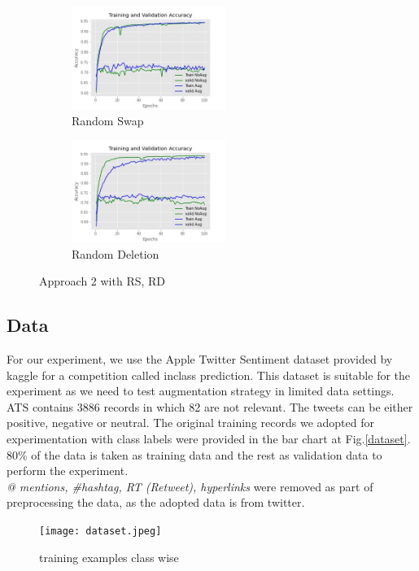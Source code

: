 \documentclass{article}
\begin{document}
\begin{figure}
  \begin{subfigure}{6cm}
    \centering\includegraphics[width=5cm]{accuracyrandomswapA2.jpg}
    \caption{Random Swap}
  \end{subfigure}
  \begin{subfigure}{6cm}
    \centering\includegraphics[width=5cm]{accuracyrandomdeleteA2.jpg}
    \caption{Random Deletion}
  \end{subfigure}
  \caption{Approach 2 with RS, RD}
  \label{fig:postaugmentA2}
\end{figure}


\subsection{Data}
For our experiment, we use the Apple Twitter Sentiment dataset provided by kaggle for a competition called inclass prediction. This dataset is suitable for the experiment as we need to test augmentation strategy in limited data settings. ATS contains 3886 records in which 82 are not relevant. The tweets can be either positive, negative or neutral. The original training records we adopted for experimentation with class labels were provided in the bar chart at Fig.\ref{dataset}. 80\% of the data is taken as training data and the rest as validation data to perform the experiment. \textit{\\@ mentions, \#hashtag, RT (Retweet), hyperlinks} were removed as part of preprocessing the data, as the adopted data is from twitter.


\begin{figure}[h!]
\centering
  \texttt{[image: dataset.jpeg]}
  \caption{training examples class wise}
  \label{fig:dataset}
\end{figure}
\end{document}

